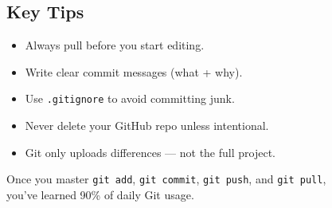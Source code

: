 \documentclass[11pt,letterpaper]{article}
\newcommand{\code}[1]{\textcolor{codeorange}{\texttt{#1}}}
\begin{document}
\subsection{Key Tips}
\begin{itemize}
    \item Always pull before you start editing.
    \item Write clear commit messages (what + why).
    \item Use \code{.gitignore} to avoid committing junk.
    \item Never delete your GitHub repo unless intentional.
    \item Git only uploads differences — not the full project.
\end{itemize}

\begin{quotebox}
Once you master \texttt{git add}, \texttt{git commit}, \texttt{git push}, and \texttt{git pull},\\
you’ve learned 90\% of daily Git usage.
\end{quotebox}
\end{document}
